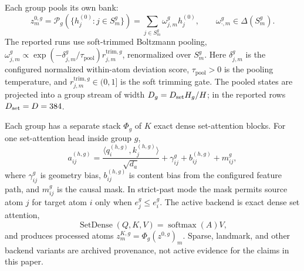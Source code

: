 \documentclass{article}
\theoremstyle{plain}
\theoremstyle{definition}
\theoremstyle{remark}
\begin{document}
Each group pools its own bank:
\begin{equation}
\label{eq:main-pooling}
z_m^{0,g}=\mathcal P_g(\{h_j^{(0)}:j\in S_m^g\})
=\sum_{j\in S_m^g}\omega_{j,m}^g h_j^{(0)},\qquad
\omega_{\cdot,m}^g\in\Delta(S_m^g).
\end{equation}
The reported runs use soft-trimmed Boltzmann pooling,
$\omega_{j,m}^g\propto
\exp(-\delta_{j,m}^g/\tau_{\mathrm{pool}})r^{\mathrm{trim},g}_{j,m}$,
renormalized over $S_m^g$.  Here $\delta_{j,m}^g$ is the configured normalized
within-atom deviation score, $\tau_{\mathrm{pool}}>0$ is the pooling
temperature, and $r^{\mathrm{trim},g}_{j,m}\in(0,1]$ is the soft trimming
gate.  The pooled states are projected into a group stream
of width $D_g=D_{\rm set}H_g/H$; in the reported rows $D_{\rm set}=D=384$.

Each group has a separate stack $\Phi_g$ of $K$ exact dense set-attention blocks.
For one set-attention head inside group $g$,
\begin{equation}
\label{eq:main-set-score}
a_{ij}^{(h,g)}=
\frac{\langle q_i^{(h,g)},k_j^{(h,g)}\rangle}{\sqrt{d_a}}
+\gamma_{ij}^g+b_{ij}^{(h,g)}+m_{ij}^g,
\end{equation}
where $\gamma_{ij}^g$ is geometry bias, $b_{ij}^{(h,g)}$ is content bias from the
configured feature path, and $m_{ij}^g$ is the causal mask.  In strict-past mode
the mask permits source atom $j$ for target atom $i$ only when
$e_j^g\le e_i^g$.  The active backend is exact dense set attention,
\begin{equation}
\label{eq:main-set-dense}
\operatorname{SetDense}(Q,K,V)=\operatorname{softmax}(A)V,
\end{equation}
and produces processed atoms $z_m^{K,g}=\Phi_g(z^{0,g})_m$.
Sparse, landmark, and other backend variants are archived provenance, not active
evidence for the claims in this paper.
\end{document}
